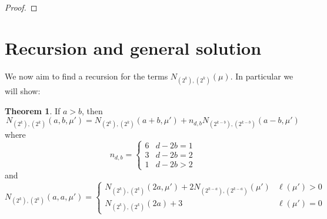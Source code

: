 \documentclass[thesis]{thesis-umich}           %
\theoremstyle{definition}
\newtheorem{thm}{Theorem}[section]
\begin{document}
\begin{proof}
\end{proof}

\section{Recursion and general solution}

We now aim to find a recursion for the terms $N_{(2^k),(2^k)}(\mu)$. In particular we will show:

\begin{thm}
  If $a>b$, then
  \[
  N_{(2^k),(2^k)}(a,b,\mu')=N_{(2^k),(2^k)}(a+b,\mu')+n_{d,b}N_{(2^{k-b}),(2^{k-b})}(a-b,\mu')
  \]
  where \[n_{d,b}=\begin{cases}
  6 & d-2b=1 \\
  3 & d-2b=2 \\
  1 & d-2b>2 \end{cases}
  \]
  and
  \[
  N_{(2^k),(2^k)}(a,a,\mu')=
  \begin{cases}
    N_{(2^k),(2^k)}(2a,\mu')+2N_{(2^{k-a}),(2^{k-a})}(\mu') & \ell(\mu')>0 \\
    N_{(2^k),(2^k)}(2a)+3 & \ell(\mu')=0
    \end{cases}
  \]
  \end{thm}
\end{document}
